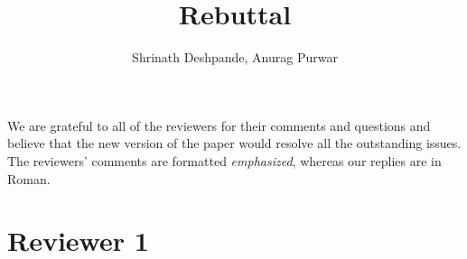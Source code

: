 \documentclass{article}
\title{Rebuttal}
\author{Shrinath Deshpande, Anurag Purwar}
\begin{document}
\maketitle
We are grateful to all of the reviewers for their comments and questions and believe that the new version of the paper would resolve all the outstanding issues.
The reviewers' comments are formatted \emph{emphasized}, whereas our replies are in Roman.

\section{Reviewer 1}
\end{document}
